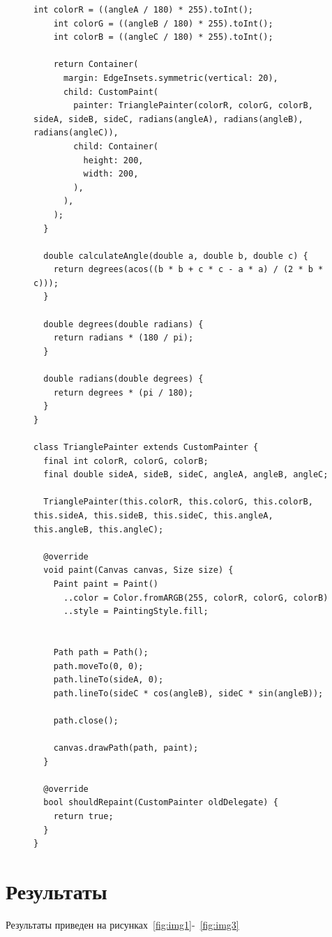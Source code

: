 \documentclass[a4paper, 14pt]{extarticle}
\begin{document}
\begin{figure}[H]
\begin{lstlisting}[language={},caption={Реализация мобильного приложения},label={lst:code1}]
    int colorR = ((angleA / 180) * 255).toInt();
    int colorG = ((angleB / 180) * 255).toInt();
    int colorB = ((angleC / 180) * 255).toInt();

    return Container(
      margin: EdgeInsets.symmetric(vertical: 20),
      child: CustomPaint(
        painter: TrianglePainter(colorR, colorG, colorB, sideA, sideB, sideC, radians(angleA), radians(angleB), radians(angleC)),
        child: Container(
          height: 200,
          width: 200,
        ),
      ),
    );
  }

  double calculateAngle(double a, double b, double c) {
    return degrees(acos((b * b + c * c - a * a) / (2 * b * c)));
  }

  double degrees(double radians) {
    return radians * (180 / pi);
  }

  double radians(double degrees) {
    return degrees * (pi / 180);
  }
}

class TrianglePainter extends CustomPainter {
  final int colorR, colorG, colorB;
  final double sideA, sideB, sideC, angleA, angleB, angleC;

  TrianglePainter(this.colorR, this.colorG, this.colorB, this.sideA, this.sideB, this.sideC, this.angleA, this.angleB, this.angleC);

  @override
  void paint(Canvas canvas, Size size) {
    Paint paint = Paint()
      ..color = Color.fromARGB(255, colorR, colorG, colorB)
      ..style = PaintingStyle.fill;


    Path path = Path();
    path.moveTo(0, 0);
    path.lineTo(sideA, 0);
    path.lineTo(sideC * cos(angleB), sideC * sin(angleB));

    path.close();

    canvas.drawPath(path, paint);
  }

  @override
  bool shouldRepaint(CustomPainter oldDelegate) {
    return true;
  }
}
\end{lstlisting}
\end{figure}


\section{Результаты}

Результаты приведен на рисунках~\ref{fig:img1}-~\ref{fig:img3}
\end{document}
